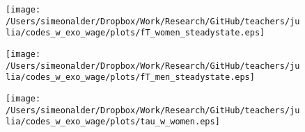 \documentclass[11pt]{beamer}
\begin{document}
\begin{frame}
\begin{figure}
\begin{center}
\texttt{[image: /Users/simeonalder/Dropbox/Work/Research/GitHub/teachers/julia/codes\_w\_exo\_wage/plots/fT\_women\_steadystate.eps]}
\label{ }
\end{center}
\end{figure}
\end{frame}

\begin{frame}
\begin{figure}
\begin{center}
\texttt{[image: /Users/simeonalder/Dropbox/Work/Research/GitHub/teachers/julia/codes\_w\_exo\_wage/plots/fT\_men\_steadystate.eps]}
\label{ }
\end{center}
\end{figure}
\end{frame}

\begin{frame}
\begin{figure}
\begin{center}
\texttt{[image: /Users/simeonalder/Dropbox/Work/Research/GitHub/teachers/julia/codes\_w\_exo\_wage/plots/tau\_w\_women.eps]}
\label{ }
\end{center}
\end{figure}
\end{frame}
\end{document}
